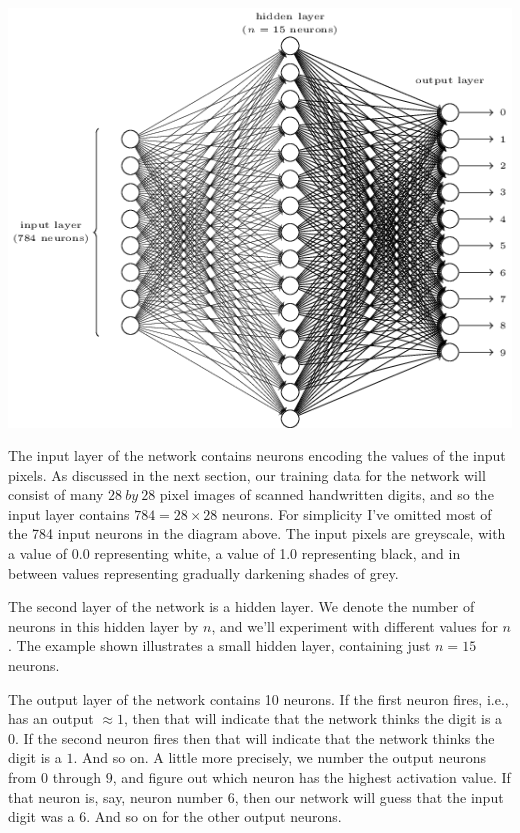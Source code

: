 \documentclass[a4paper,12pt]{report}%
\begin{document}
\begin{center}
 \includegraphics[width=0.85\linewidth]{images/tikz12.png}
\end{center}

The input layer of the network contains neurons encoding the values of the input pixels. As discussed in the next section, our training data for the network will consist of many $28~by~28$ pixel images of scanned handwritten digits, and so the input layer contains $784=28 \times 28$ neurons. For simplicity I've omitted most of the 784 input neurons in the diagram above. The input pixels are greyscale, with a value of 0.0 representing white, a value of 1.0 representing black, and in between values representing gradually darkening shades of grey.

The second layer of the network is a hidden layer. We denote the number of neurons in this hidden layer by $n$, and we'll experiment with different values for $n$. The example shown illustrates a small hidden layer, containing just $n=15$ neurons.

The output layer of the network contains 10 neurons. If the first neuron fires, i.e., has an output $ ≈ 1 $, then that will indicate that the network thinks the digit is a $0$. If the second neuron fires then that will indicate that the network thinks the digit is a $1$. And so on. A little more precisely, we number the output neurons from $0$ through $9$, and figure out which neuron has the highest activation value. If that neuron is, say, neuron number $6$, then our network will guess that the input digit was a $6$. And so on for the other output neurons.
\end{document}

